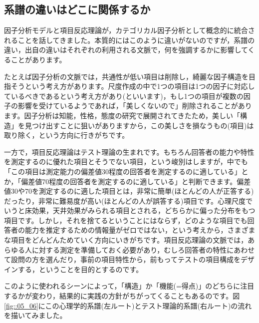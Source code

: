 \documentclass{ltjsbook}
\begin{document}
\subsection{系譜の違いはどこに関係するか}

因子分析モデルと項目反応理論が，カテゴリカル因子分析として概念的に統合されることを話してきました。本質的にはこのように違いがないのですが，系譜の違い，出自の違いはそれぞれの利用される文脈で，何を強調するかに影響してくることがあります。

たとえば因子分析の文脈では，共通性が低い項目は削除し，綺麗な因子構造を目指そうという考え方があります。尺度作成の中で1つの項目は1つの因子に対応しているべきであるという考え方があり(といいます)，もし1つの項目が複数の因子の影響を受けているようであれば，「美しくないので」削除されることがあります。因子分析は知能，性格，態度の研究で展開されてきたため，美しい「構造」を見つけ出すことに狙いがありますから，この美しさを損なうもの(項目)は取り除く，という方向に行きがちです。

一方で，項目反応理論はテスト理論の生まれです。もちろん回答者の能力や特性を測定するのに優れた項目とそうでない項目，という峻別はしますが，中でも「この項目は測定能力の偏差値30程度の回答者を測定するのに適している」とか，「偏差値70程度の回答者を測定するのに適している」と判断できます。偏差値30や70を測定するのに適した項目とは，非常に簡単(ほとんどの人が正答する)だったり，非常に難易度が高い(ほとんどの人が誤答する)項目です。心理尺度でいうと床効果，天井効果がみられる項目とされる，どちらかに偏った分布をもつ項目です。しかし，それを捨てるということにはならず，どのような項目でも回答者の能力を推定するための情報量がゼロではない，という考えから，さまざまな項目をどんどんためていく方向にいきがちです。項目反応理論の文脈では，あらゆる人に対する測定を準備しておく必要があり，むしろ回答者の特性にあわせて設問の方を選んだり，事前の項目特性から，前もってテストの項目構成をデザインする，ということを目的とするのです。

このように使われるシーンによって，「構造」か「機能(=得点)」のどちらに注目するかが変わり，結果的に実践の方針がちがってくることもあるのです。図\ref{fig::05_06}にこの心理学的系譜(左ルート)とテスト理論的系譜(右ルート)の流れを描いてみました。
\end{document}
